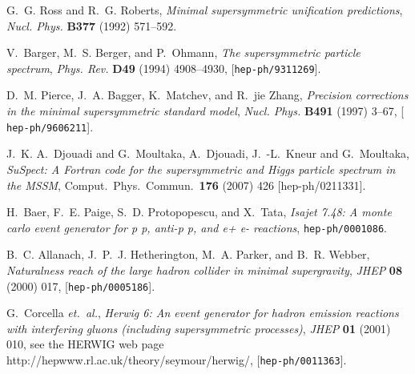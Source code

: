 \documentclass[]{article}
\begin{document}
\providecommand{\href}[2]{#2}\begingroup\raggedright\begin{thebibliography}{10}

G.~G. Ross and R.~G. Roberts, {\it Minimal supersymmetric unification
  predictions},  {\em Nucl. Phys.} {\bf B377} (1992) 571--592.

V.~Barger, M.~S. Berger, and P.~Ohmann, {\it The supersymmetric particle
  spectrum},  {\em Phys. Rev.} {\bf D49} (1994) 4908--4930,
  [\href{http://xxx.lanl.gov/abs/hep-ph/9311269}{{\tt hep-ph/9311269}}].

D.~M. Pierce, J.~A. Bagger, K.~Matchev, and R.~jie Zhang, {\it Precision
  corrections in the minimal supersymmetric standard model},  {\em Nucl. Phys.}
  {\bf B491} (1997) 3--67, [\href{http://xxx.lanl.gov/abs/hep-ph/9606211}{{\tt
  hep-ph/9606211}}].

J.~K. A.~Djouadi and G.~Moultaka, A.~Djouadi, J.~-L.~Kneur and G.~Moultaka,
  {\em SuSpect: A Fortran code for the supersymmetric and Higgs particle spectrum in the MSSM},
  Comput.\ Phys.\ Commun.\  {\bf 176} (2007) 426
  [hep-ph/0211331].

H.~Baer, F.~E. Paige, S.~D. Protopopescu, and X.~Tata, {\it Isajet 7.48: A
  monte carlo event generator for p p, anti-p p, and e+ e- reactions},
  \href{http://xxx.lanl.gov/abs/hep-ph/0001086}{{\tt hep-ph/0001086}}.

B.~C. Allanach, J.~P.~J. Hetherington, M.~A. Parker, and B.~R. Webber, {\it
  Naturalness reach of the large hadron collider in minimal supergravity},
  {\em JHEP} {\bf 08} (2000) 017,
  [\href{http://xxx.lanl.gov/abs/hep-ph/0005186}{{\tt hep-ph/0005186}}].

G.~Corcella {\em et.~al.}, {\it Herwig 6: An event generator for hadron
  emission reactions with interfering gluons (including supersymmetric
  processes)},  {\em JHEP} {\bf 01} (2001) 010,
  see the \href{http://hepwww.rl.ac.uk/theory/seymour/herwig/}{HERWIG web
page http://hepwww.rl.ac.uk/theory/seymour/herwig/}, 
  [\href{http://xxx.lanl.gov/abs/hep-ph/0011363}{{\tt hep-ph/0011363}}].



\end{thebibliography}
\end{document}
